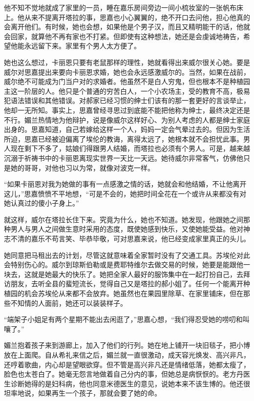\par 他不知不觉地就成了家里的一员，睡在嘉乐房间旁边一间小梳妆室的一张帆布床上。他从来不提离开塔拉的事，思嘉也小心翼翼的，绝不开口去问他，担心他真的会离开他们。有时候，她也会想，如果他是个男子汉，而且又精明能干的话，他就会回家，就算他不再有家也不打紧。但即使有这种想法，她还是会虔诚地祷告，希望他能永远留下来。家里有个男人太方便了。
\par 她也这么想过，卡丽恩只要有老鼠那样的理性，她就看得出来威尔很关心她。要是威尔对思嘉提出来要向卡丽恩求婚，她也会永远感激威尔的。当然，如果在战前，威尔绝不可能成为门当户对的求婚者。他虽然不是白人穷鬼，但也根本不是种植园主这一阶层的人。他只是个普通的穷苦白人，一个小农场主，受的教育不高，极易犯语法错误和其他错误。对郝家已经习惯的绅士们该有的那一套更好的言谈举止，他却一无所知。事实上，思嘉曾经寻思过到底能不能把他称为绅士，最终决定还是不行。媚兰热情地为他辩护，说是像威尔这样好心、为别人考虑的人都是绅士家庭出身的。思嘉知道，自己若嫁给这样一个人，妈妈一定会气晕过去的。但因为生活所迫，思嘉已经被迫偏离了埃伦的教诲，离得太远了，她根本就不会担忧此事。男人现在剩下不多了，姑娘们得跟男人结婚，而塔拉也必须有个男人。可是，越来越沉溺于祈祷书中的卡丽恩离现实世界一天比一天远。她待威尔非常客气，仿佛他只是她的哥哥，对他也习以为常，就像对波克一样。
\par “如果卡丽恩对我为她做的事有一点感激之情的话，她就会和他结婚，不让他离开这儿，”思嘉愤愤不平地想，“可是不会的，她把时间全花在一个或许从来都没有对她认真过的傻小子身上。”
\par 就这样，威尔在塔拉长住下来。究竟为什么，她也不知道。她发现，他跟她之间那种男人与男人之间做生意时采用的态度，既使她感到快乐，又使她能受益。他对神志不清的嘉乐不苟言笑、毕恭毕敬，可对思嘉来说，他已经变成家里真正的头儿。
\par 她同意把马租出去的计划，尽管这就意味着全家暂时没有了交通工具。苏埃伦对此会特别伤心的。威尔到琼斯伯勒或是费耶特维尔去做交易的时候，她要是能跟他一块去，这就是她最大的快乐了。她把全家人最好的服饰集中在一起打扮自己，去拜访朋友，去听全县的蜚短流长，觉得自己又是塔拉的郝小姐了。任何一个能离开种植园的机会苏埃伦从来都不会放弃。她虽然也在果园里除草、在家里铺床，但在那些不知情的人面前，她还可以装装样子。
\par “端架子小姐足有两个星期不能出去闲逛了，”思嘉心想，“我们得忍受她的唠叨和叫嚷了。”
\par 媚兰抱着孩子来到游廊上，加入了他们的行列。她在地上铺开一块旧毯子，把小博放在上面爬。自从希礼来信之后，媚兰就一直很激动，成天容光焕发、高兴非凡，还哼着歌曲，内心却是望眼欲穿。但不管是高兴非凡还是情绪低落，她都太瘦了，脸色也太苍白了。她毫无怨言地做着自己分内的事，但她总是病恹恹的。老方丹医生诊断她得的是妇科病，他也同意米德医生的意见，说她本来不该生博的。他还很坦率地说，如果再生一个孩子，那就会要了她的命。
